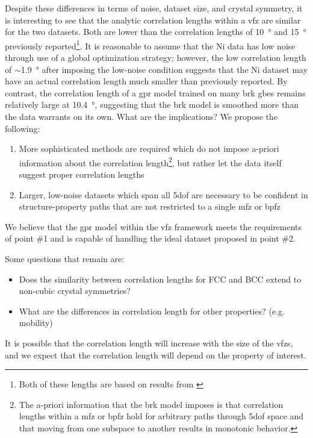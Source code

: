 \documentclass[final,twocolumn,12pt]{elsarticle}
\begin{document}
	Despite these differences in terms of noise, dataset size, and crystal symmetry, it is interesting to see that the analytic correlation lengths within a \gls{vfz} are similar for the two datasets. Both are lower than the correlation lengths of \SI{10}{\degree} \cite{rohrerComparingCalculatedMeasured2010} and \SI{15}{\degree} \cite{olmstedSurveyComputedGrain2009} previously reported\footnote{Both of these lengths are based on results from \citet{olmstedSurveyComputedGrain2009} }. It is reasonable to assume that the Ni data has low noise through use of a global optimization strategy\cite{olmstedSurveyComputedGrain2009}; however, the low correlation length of $\sim$\SI{1.9}{\degree} after imposing the low-noise condition suggests that the Ni dataset may have an actual correlation length much smaller than previously reported. By contrast, the correlation length of a \gls{gpr} model trained on many \gls{brk} \glspl{gbe} remains relatively large at \SI{10.4}{\degree}, suggesting that the \gls{brk} model is smoothed more than the data warrants on its own. What are the implications? We propose the following:
	\begin{enumerate}
	    \item More sophisticated methods are required which do not impose a-priori information about the correlation length\footnote{The a-priori information that the \gls{brk} model imposes is that correlation lengths within a \gls{mfz} or \gls{bpfz} hold for arbitrary paths through \gls{5dof} space and that moving from one subspace to another results in monotonic behavior. }, but rather let the data itself suggest proper correlation lengths
	    \item Larger, low-noise datasets which span all \gls{5dof} are necessary to be confident in structure-property paths that are not restricted to a single \gls{mfz} or \gls{bpfz}
	\end{enumerate}
	
	We believe that the \gls{gpr} model within the \gls{vfz} framework meets the requirements of point \#1 and is capable of handling the ideal dataset proposed in point \#2.
	
	Some questions that remain are:
	\begin{itemize}
	    \item Does the similarity between correlation lengths for FCC and BCC extend to non-cubic crystal symmetries?
	    \item What are the differences in correlation length for other properties? (e.g. mobility)
	\end{itemize}
	It is possible that the correlation length will increase with the size of the \glspl{vfz}, and we expect that the correlation length will depend on the property of interest.
\end{document}
